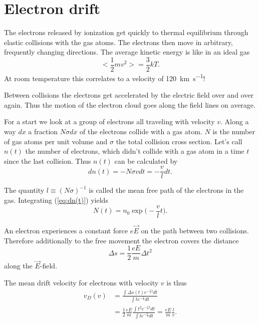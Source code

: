 \documentclass[12pt]{article}
\begin{document}
\section{Electron drift}

The electrons released by ionization get quickly to thermal equilibrium through elastic collisions with the gas atoms. The electrons then move in arbitrary, frequently changing directions. The average kinetic energy is like in an ideal gas
\begin{equation}
< \frac{1}{2} m v^2 > = \frac{3}{2} k T.
\end{equation}
At room temperature this correlates to a velocity of \SI{120}{\kilo\meter\per\second}!

Between collisions the electrons get accelerated by the electric field over and over again. Thus the motion of the electron cloud goes along the field lines on average. 

For a start we look at a group of electrons all traveling with velocity $v$. Along a way $dx$ a fraction $N \sigma dx$ of the electrons collide with a gas atom. $N$ is the number of gas atoms per unit volume and $\sigma$ the total collision cross section. Let's call $n(t)$ the number of electrons, which didn't collide with a gas atom in a time $t$ since the last collision. Thus $n(t)$ can be calculated by
\begin{equation}
dn(t) = - N \sigma v dt = -\frac{v}{l} dt.
\label{eq:dn(t)}
\end{equation}

The quantity $l \equiv (N \sigma)^{-1}$ is called the mean free path of the electrons in the gas. Integrating (\ref{eq:dn(t)}) yields
\begin{equation}
N(t) = n_0 \exp\Big(-\frac{v}{l} t \Big).
\end{equation}

An electron experiences a constant force $e \vec{E}$ on the path between two collisions. Therefore additionally to the free movement the electron covers  the distance 
\begin{equation}
\Delta s = \frac{1}{2} \frac{eE}{m} \Delta t^2
\end{equation}
along the $\vec{E}$-field.

The mean drift velocity for electrons with velocity $v$ is thus
\begin{align*}
 v_D(v) & = \frac{\int \Delta s(t) e^{-\frac{v}{l} t}dt}{\int t e^{-\frac{v}{l}}dt} \\
 & = \frac{1}{2}\frac{eE}{m} \frac{\int t^2 e^{-\frac{v}{l} t}dt}{\int t e^{-\frac{v}{l}}dt} = \frac{eE}{m} \frac{l}{v}.
\end{align*}
\end{document}
